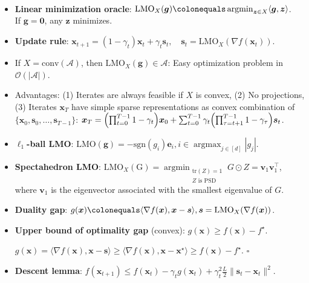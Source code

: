 \documentclass[8pt,a4paper]{extarticle}
\renewcommand{\proof}[1]{\begin{tcolorbox}#1 \hfill $\square$\end{tcolorbox}}
\DeclareMathOperator*{\argmax}{argmax}
\DeclareMathOperator*{\argmin}{argmin}
\newcommand{\lft}{\mathopen{}\mathclose\bgroup\left}
\newcommand{\rgt}{\aftergroup\egroup\right}
\renewcommand{\vec}[1]{\bm{#1}}
\newcommand{\mat}[1]{#1}
\newenvironment{topic}[1]
{\textbf{\sffamily \colorbox{black}{\rlap{\textbf{\textcolor{white}{#1}}}\hspace{\linewidth}\hspace{-2\fboxsep}}} \\ \vspace{0.2cm}}
{}
\begin{document}
\begin{multicols*}{2}
    \begin{topic}{Frank-Wolfe}
        \begin{itemize}
            \item \textbf{Linear minimization oracle}: $\mathrm{LMO}_X(\vec{g}) \colonequals \argmin_{\vec{z} \in X} \langle \vec{g}, \vec{z} \rangle$. \\
                  If $\vec{g} = \vec{0}$, any $\vec{z}$ minimizes.
            \item \textbf{Update rule}: $\vec{x}_{t+1} = (1-\gamma_t) \vec{x}_t + \gamma_t \vec{s}_t, \quad \vec{s}_t = \mathrm{LMO}_X(\nabla f(\vec{x}_t))$.
            \item If $X = \mathrm{conv}(\mathcal{A})$, then $\mathrm{LMO}_X(\vec{g}) \in \mathcal{A}$: Easy
                  optimization problem in $\mathcal{O}(|\mathcal{A}|)$.
            \item Advantages: (1) Iterates are always feasible if $X$ is convex, (2) No projections, (3) Iterates
                  $\vec{x}_T$ have simple sparse representations as convex combination of $\{ \vec{x}_0, \vec{s}_0,
                      \ldots, \vec{s}_{T-1} \}$: $\vec{x}_T = \lft( \prod_{t=0}^{T-1} 1-\gamma_t \rgt) \vec{x}_0 +
                      \sum_{t=0}^{T-1} \gamma_t \lft( \prod_{\tau=t+1}^{T-1} 1 - \gamma_\tau \rgt) \vec{s}_t$.
            \item \textbf{$\ell_1$-ball LMO}: $\mathrm{LMO}(\vec{g}) = -\mathrm{sgn}(g_i) \vec{e}_i, i \in \argmax_{j
                          \in [d]} |g_j|$.
            \item \textbf{Spectahedron LMO}: $\mathrm{LMO}_X(\mathrm{G}) = \argmin_{\substack{\mathrm{tr}(\mat{Z}) = 1 \\ \text{$Z$ is PSD}}} \mat{G} \odot \mat{Z} = \vec{v}_1 \vec{v}_1^\top$,
                  where $\vec{v}_1$ is the eigenvector associated with the smallest eigenvalue of $\mat{G}$.
            \item \textbf{Duality gap}: $g(\vec{x}) \colonequals \langle \nabla f(\vec{x}), \vec{x} - \vec{s} \rangle, \vec{s} = \mathrm{LMO}_X(\nabla f(\vec{x}))$.
            \item \textbf{Upper bound of optimality gap} (convex): $g(\vec{x}) \geq f(\vec{x}) - f^\star$.
                  \proof{$g(\vec{x}) = \langle \nabla f(\vec{x}), \vec{x} - \vec{s} \rangle \geq \langle \nabla f(\vec{x}), \vec{x} - \vec{x}^\star \rangle \geq f(\vec{x}) - f^\star$.}
            \item \textbf{Descent lemma}: $f(\vec{x}_{t+1}) \leq f(\vec{x}_t) - \gamma_t g(\vec{x}_t) + \gamma_t^2 \frac{L}{2} \| \vec{s}_t - \vec{x}_t \|^2$.

\end{itemize}
\end{topic}
\end{multicols*}
\end{document}
